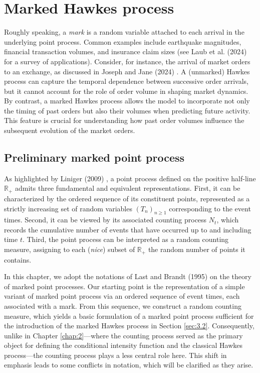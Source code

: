 \documentclass[12pt,a4paper]{report}
\theoremstyle{plain}
\theoremstyle{definition}
\theoremstyle{remark}
\newcommand{\1}{\mathbf{1}}
\begin{document}
\chapter{Marked Hawkes process}
\label{chap:3}

Roughly speaking, a \emph{mark} is a random variable attached to each arrival in the underlying point process. Common examples include earthquake magnitudes, financial transaction volumes, and insurance claim sizes (see Laub et al. (2024) \cite{LLPT24} for a survey of applications). Consider, for instance, the arrival of market orders to an exchange, as discussed in Joseph and Jane (2024) \cite{JJ24}. A (unmarked) Hawkes process can capture the temporal dependence between successive order arrivals, but it cannot account for the role of order volume in shaping market dynamics. By contrast, a marked Hawkes process allows the model to incorporate not only the timing of past orders but also their volumes when predicting future activity. This feature is crucial for understanding how past order volumes influence the subsequent evolution of the market orders.

\section{Preliminary marked point process}\label{sec:3.1}
As highlighted by Liniger (2009) \cite{Lin09}, a point process defined on the positive half-line $\mathbb{R}_+$ admits three fundamental and equivalent representations. First, it can be characterized by the ordered sequence of its constituent points, represented as a strictly increasing set of random variables $(T_n)_{n\ge 1}$ corresponding to the event times. Second, it can be viewed by its associated counting process $N_t$, which records the cumulative number of events that have occurred up to and including time $t$. Third, the point process can be interpreted as a random counting measure, assigning to each (\emph{nice}) subset of $\mathbb{R}_+$ the random number of points it contains.

\medskip
\noindent
In this chapter, we adopt the notations of Last and Brandt (1995) \cite{LB95} on the theory of marked point processes. Our starting point is the representation of a simple variant of marked point process via an ordered sequence of event times, each associated with a mark. From this sequence, we construct a random counting measure, which yields a basic formulation of a marked point process sufficient for the introduction of the marked Hawkes process in Section \ref{sec:3.2}. Consequently, unlike in Chapter \ref{chap:2}---where the counting process served as the primary object for defining the conditional intensity function and the classical Hawkes process---the counting process plays a less central role here. This shift in emphasis leads to some conflicts in notation, which will be clarified as they arise.
\end{document}
